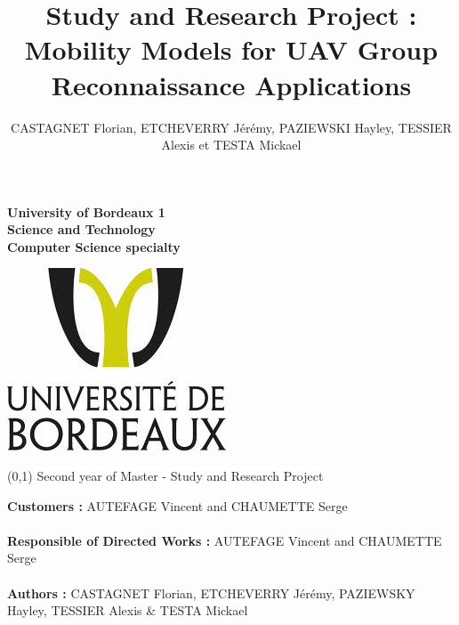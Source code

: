 \documentclass[12pt,a4paper]{report}
\author{CASTAGNET Florian, ETCHEVERRY Jérémy, PAZIEWSKI Hayley, TESSIER Alexis et TESTA Mickael}
\title{Study and Research Project : Mobility Models for UAV Group Reconnaissance Applications}
\begin{document}
\thispagestyle{empty}
\setcounter{page}{0}

\begin{minipage}{0.5\linewidth}
\begin{flushleft}
\textbf{University of Bordeaux 1 \\Science and Technology \\Computer Science specialty}\\ 
\end{flushleft}
\end{minipage}
\begin{minipage}{0.5\linewidth}
\begin{flushright}
\includegraphics[scale = 0.4]{../images/logo}
\end{flushright}
\end{minipage}

\vspace{4cm}

\begin{center}
\boxput*(0,1){
\colorbox{white}{Second year of Master - Study and Research Project}
}
{
\setlength{\fboxsep}{12pt} 
}


\end{center}


\vspace{4cm}



\noindent
\begin{center}

\textbf{Customers :} AUTEFAGE Vincent and CHAUMETTE Serge\\~\\
\textbf{Responsible of Directed Works :} AUTEFAGE Vincent and CHAUMETTE Serge\\~\\
\vspace{4cm}
\textbf{Authors :} CASTAGNET Florian, ETCHEVERRY Jérémy, PAZIEWSKY Hayley, TESSIER Alexis \& TESTA Mickael\\
\end{center}
\newpage
\thispagestyle{empty}
\setcounter{page}{0}
\end{document}

